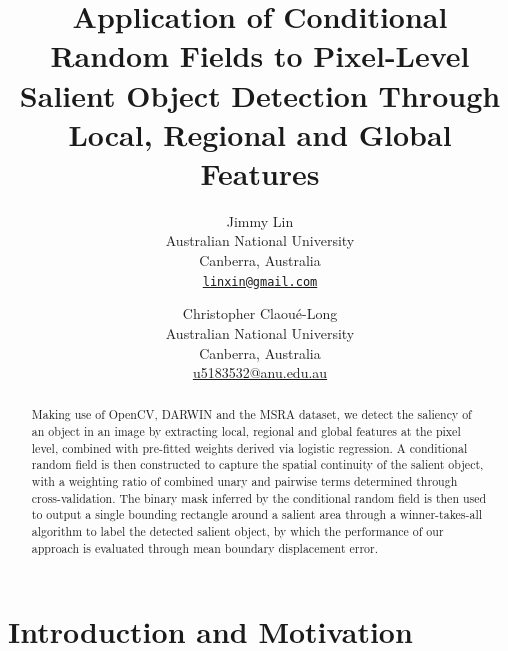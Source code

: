 \documentclass[10pt,twocolumn,letterpaper]{article}
\begin{document}
\title{Application of Conditional Random Fields to Pixel-Level Salient Object Detection Through Local, Regional and Global Features}

\author{Jimmy Lin\\
Australian National University\\
Canberra, Australia\\
{\tt\small \url{linxin@gmail.com}}
\and
Christopher Claou\'e-Long\\
Australian National University\\
Canberra, Australia\\
{\small\url{u5183532@anu.edu.au}}
}

\maketitle

\begin{abstract}
Making use of OpenCV, DARWIN and the MSRA dataset, we detect the saliency of an object in an image by extracting local, regional and global features at the pixel level,  combined with pre-fitted weights derived via logistic regression. A conditional random field is then constructed to capture the spatial continuity of the salient object, with a weighting ratio of combined unary and pairwise terms determined through cross-validation. The binary mask inferred by the conditional random field is then used to output a single bounding rectangle around a salient area through a winner-takes-all algorithm to label the detected salient object, by which the performance of our approach is evaluated through mean boundary displacement error. 

\end{abstract}

\section{Introduction and Motivation}
\end{document}
